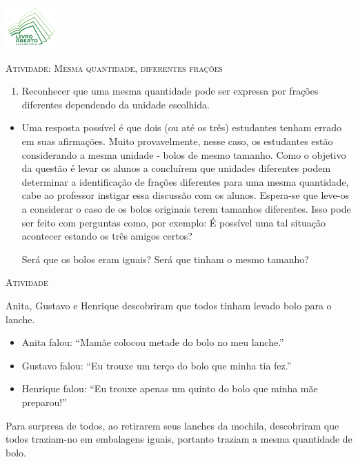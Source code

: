 \documentclass[10 pt,usenames,dvipsnames, oneside]{article}
\begin{document}
\begin{center}
  \begin{minipage}[l]{3cm}
\includegraphics[width=2cm]{logo}    
\end{minipage}\hfill
\begin{minipage}[r]{.8\textwidth}
 {\Large \scshape Atividade: Mesma quantidade, diferentes frações}  
\end{minipage}
\end{center}
\vspace{.2cm}

\ifdefined\prof
\begin{goals}
\begin{enumerate}

    \item Reconhecer que uma mesma quantidade pode ser expressa por frações diferentes dependendo da unidade escolhida.

\end{enumerate}
\tcblower

  \begin{itemize} %
  \item Uma resposta possível é que dois (ou até os três) estudantes tenham errado em suas afirmações.    Muito provavelmente, nesse caso, os estudantes estão considerando a mesma unidade - bolos de mesmo tamanho. 
Como o objetivo da questão é levar os alunos a concluírem que unidades diferentes podem determinar a identificação de frações diferentes para uma mesma quantidade, cabe ao professor instigar essa discussão com os alunos. Espera-se que leve-os a considerar o caso de os bolos originais terem tamanhos diferentes. Isso pode ser feito com perguntas como, por exemplo: É possível uma tal situação acontecer estando os três amigos certos?

Será que os bolos eram iguais? Será que tinham o mesmo tamanho? 
\end{itemize}

\end{goals}

\bigskip
\begin{center}
{\large \scshape Atividade}
\end{center}
\fi

Anita, Gustavo e Henrique descobriram que todos tinham levado bolo para o lanche.
\begin{itemize}[label=---]
\item Anita falou: ``Mamãe colocou metade do bolo no meu lanche.''
\item Gustavo falou: ``Eu trouxe um terço do bolo que minha tia fez.''
\item Henrique falou: ``Eu trouxe apenas um quinto do bolo que minha mãe preparou!''
\end{itemize}
Para surpresa de todos, ao retirarem seus lanches da mochila, descobriram que todos traziam-no em  embalagens iguais, portanto traziam a mesma quantidade de bolo.
\end{document}

